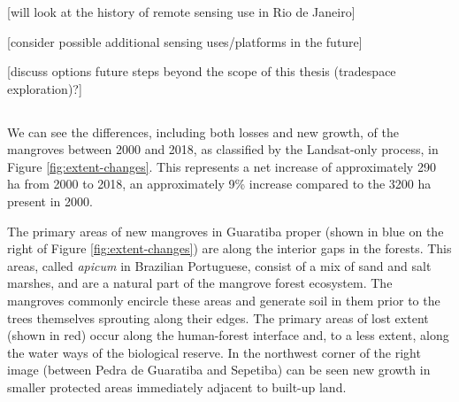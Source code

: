 \subsubsection{}

[will look at the history of remote sensing use in Rio de Janeiro]

[consider possible additional sensing uses/platforms in the future]

[discuss options future steps beyond the scope of this thesis (tradespace exploration)?]

\subsection{} \label{sec:rio-evdt-result}

\subsubsection{} \label{sec:rio-evdt-e-result}


\paragraph{} \leavevmode\newline

We can see the differences, including both losses and new growth, of the mangroves between 2000 and 2018, as classified by the Landsat-only process, in Figure \ref{fig:extent-changes}. This represents a net increase of approximately 290 ha from 2000 to 2018, an approximately 9\% increase compared to the 3200 ha present in 2000.

The primary areas of new mangroves in Guaratiba proper (shown in blue on the right of Figure \ref{fig:extent-changes}) are along the interior gaps in the forests. This areas, called \textit{apicum} in Brazilian Portuguese, consist of a mix of sand and salt marshes, and are a natural part of the mangrove forest ecosystem. The mangroves commonly encircle these areas and generate soil in them prior to the trees themselves sprouting along their edges. The primary areas of lost extent (shown in red) occur along the human-forest interface and, to a less extent, along the water ways of the biological reserve. In the northwest corner of the right image (between Pedra de Guaratiba and Sepetiba) can be seen new growth in smaller protected areas immediately adjacent to built-up land.

